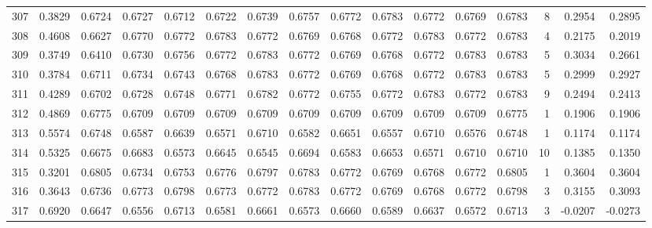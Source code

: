 \begin{tabular}{lrrrrrrrrrrrrrrr}
307 &      0.3829 &  0.6724 &  0.6727 &  0.6712 &  0.6722 &  0.6739 &  0.6757 &  0.6772 &  0.6783 &  0.6772 &   0.6769 &     0.6783 &      8 &                    0.2954 &                     0.2895 \\
308 &      0.4608 &  0.6627 &  0.6770 &  0.6772 &  0.6783 &  0.6772 &  0.6769 &  0.6768 &  0.6772 &  0.6783 &   0.6772 &     0.6783 &      4 &                    0.2175 &                     0.2019 \\
309 &      0.3749 &  0.6410 &  0.6730 &  0.6756 &  0.6772 &  0.6783 &  0.6772 &  0.6769 &  0.6768 &  0.6772 &   0.6783 &     0.6783 &      5 &                    0.3034 &                     0.2661 \\
310 &      0.3784 &  0.6711 &  0.6734 &  0.6743 &  0.6768 &  0.6783 &  0.6772 &  0.6769 &  0.6768 &  0.6772 &   0.6783 &     0.6783 &      5 &                    0.2999 &                     0.2927 \\
311 &      0.4289 &  0.6702 &  0.6728 &  0.6748 &  0.6771 &  0.6782 &  0.6772 &  0.6755 &  0.6772 &  0.6783 &   0.6772 &     0.6783 &      9 &                    0.2494 &                     0.2413 \\
312 &      0.4869 &  0.6775 &  0.6709 &  0.6709 &  0.6709 &  0.6709 &  0.6709 &  0.6709 &  0.6709 &  0.6709 &   0.6709 &     0.6775 &      1 &                    0.1906 &                     0.1906 \\
313 &      0.5574 &  0.6748 &  0.6587 &  0.6639 &  0.6571 &  0.6710 &  0.6582 &  0.6651 &  0.6557 &  0.6710 &   0.6576 &     0.6748 &      1 &                    0.1174 &                     0.1174 \\
314 &      0.5325 &  0.6675 &  0.6683 &  0.6573 &  0.6645 &  0.6545 &  0.6694 &  0.6583 &  0.6653 &  0.6571 &   0.6710 &     0.6710 &     10 &                    0.1385 &                     0.1350 \\
315 &      0.3201 &  0.6805 &  0.6734 &  0.6753 &  0.6776 &  0.6797 &  0.6783 &  0.6772 &  0.6769 &  0.6768 &   0.6772 &     0.6805 &      1 &                    0.3604 &                     0.3604 \\
316 &      0.3643 &  0.6736 &  0.6773 &  0.6798 &  0.6773 &  0.6772 &  0.6783 &  0.6772 &  0.6769 &  0.6768 &   0.6772 &     0.6798 &      3 &                    0.3155 &                     0.3093 \\
317 &      0.6920 &  0.6647 &  0.6556 &  0.6713 &  0.6581 &  0.6661 &  0.6573 &  0.6660 &  0.6589 &  0.6637 &   0.6572 &     0.6713 &      3 &                   -0.0207 &                    -0.0273 \\

\end{tabular}
